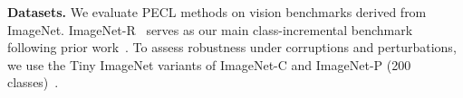 \documentclass{article}
\theoremstyle{plain}
\theoremstyle{definition}
\theoremstyle{remark}
\begin{document}



\noindent\textbf{Datasets.}\quad
We evaluate PECL methods on vision benchmarks derived from ImageNet. ImageNet-R~\cite{ImagenetR_Hendrycks_2021_ICCV} serves as our main class-incremental benchmark following prior work~\cite{liangInfLoRAInterferenceFreeLowRank2024a}.
To assess robustness under corruptions and perturbations, we use the Tiny ImageNet variants of ImageNet-C and ImageNet-P (200 classes)~\cite{hendrycks2018benchmarking}.

\end{document}
